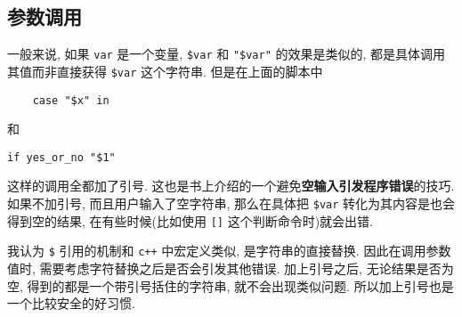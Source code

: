 \documentclass{ctexart}
\begin{document}
\subsection{参数调用} %
\label{sub:参数调用}
一般来说, 如果 \verb|var| 是一个变量, \verb|$var| 和 \verb|"$var"| 的效果是类似的, 都是具体调用其值而非直接获得 \verb|$var| 这个字符串. 但是在上面的脚本中\\
\begin{verbatim}
    case "$x" in
\end{verbatim}
和
\begin{verbatim}
if yes_or_no "$1"
\end{verbatim}
这样的调用全都加了引号. 这也是书上介绍的一个避免\textbf{空输入引发程序错误}的技巧. 如果不加引号, 而且用户输入了空字符串, 那么在具体把 \verb|$var| 转化为其内容是也会得到空的结果, 在有些时候(比如使用 \verb|[]| 这个判断命令时)就会出错.\par
我认为 \verb|$| 引用的机制和 \verb|c++| 中宏定义类似, 是字符串的直接替换. 因此在调用参数值时, 需要考虑字符替换之后是否会引发其他错误. 加上引号之后, 无论结果是否为空, 得到的都是一个带引号括住的字符串, 就不会出现类似问题. 所以加上引号也是一个比较安全的好习惯.
\end{document}
